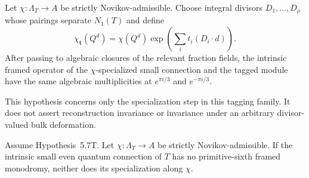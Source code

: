 \begin{hypothesisT}
Let $\chi:\Lambda_T\to A$ be strictly Novikov-admissible.  Choose integral
divisors $D_1,\ldots,D_\rho$ whose pairings separate $N_1(T)$ and define
\[
 \chi_{\boldsymbol t}(Q^d)
 =\chi(Q^d)\exp\left(\sum_i t_i(D_i\cdot d)\right).
\]
After passing to algebraic closures of the relevant fraction fields, the
intrinsic framed operator of the $\chi$-specialized small connection and
the tagged module have the same algebraic multiplicities at
$e^{\pi i/3}$ and $e^{-\pi i/3}$.

This hypothesis concerns only the specialization step in this tagging
family.  It does not assert reconstruction invariance or invariance under
an arbitrary divisor-valued bulk deformation.
\end{hypothesisT}

\begin{lemma}
\label{lem:divisor-tagging}
%
%
Assume Hypothesis~5.7T.
Let \(\chi:\Lambda_T\to A\) be strictly Novikov-admissible.  If the intrinsic
small even quantum connection of \(T\) has no primitive-sixth framed
monodromy, neither does its specialization along \(\chi\).
\end{lemma}

